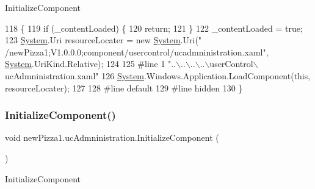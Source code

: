 Initialize\+Component 


\begin{DoxyCode}
118                                           \{
119             \textcolor{keywordflow}{if} (\_contentLoaded) \{
120                 \textcolor{keywordflow}{return};
121             \}
122             \_contentLoaded = \textcolor{keyword}{true};
123             \hyperlink{namespaceSystem}{System}.Uri resourceLocater = \textcolor{keyword}{new} \hyperlink{namespaceSystem}{System}.Uri(\textcolor{stringliteral}{"
      /newPizza1;V1.0.0.0;component/usercontrol/ucadmninistration.xaml"}, \hyperlink{namespaceSystem}{System}.UriKind.Relative);
124             
125 \textcolor{preprocessor}{            #line 1 "..\(\backslash\)..\(\backslash\)..\(\backslash\)..\(\backslash\)userControl\(\backslash\)ucAdmninistration.xaml"}
126             \hyperlink{namespaceSystem}{System}.Windows.Application.LoadComponent(\textcolor{keyword}{this}, resourceLocater);
127             
128 \textcolor{preprocessor}{            #line default}
129 \textcolor{preprocessor}{            #line hidden}
130         \}
\end{DoxyCode}
\mbox{\label{classnewPizza1_1_1ucAdmninistration_a500966f5d66cf50194a823a88df8517e}} 
\subsubsection{\texorpdfstring{Initialize\+Component()}{InitializeComponent()}\hspace{0.1cm}{\footnotesize\ttfamily [3/5]}}
{\footnotesize\ttfamily void new\+Pizza1.\+uc\+Admninistration.\+Initialize\+Component (\begin{DoxyParamCaption}{ }\end{DoxyParamCaption})\hspace{0.3cm}{\ttfamily [inline]}}



Initialize\+Component 


